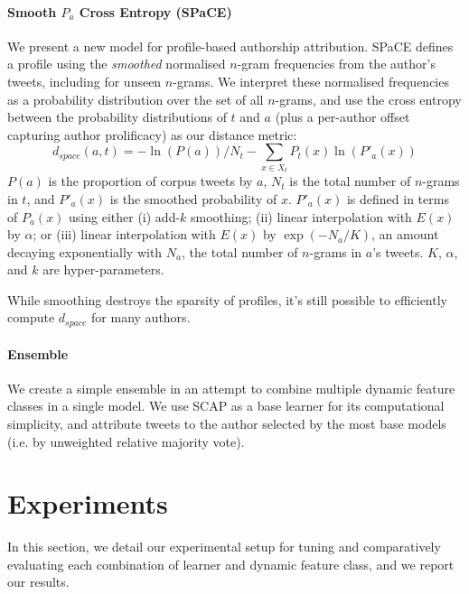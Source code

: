 \documentclass[twocolumn,10pt]{article}
\begin{document}
\paragraph{Smooth $P_a$ Cross Entropy (SPaCE)}
\hypertarget{par:space}{}
We present a new model for profile-based authorship attribution.
SPaCE defines a profile using the \emph{smoothed} normalised
$n$-gram frequencies from the author's tweets, including for
unseen $n$-grams. 
We interpret these normalised frequencies as a probability
distribution over the set of all $n$-grams, and use the cross
entropy between the probability distributions of $t$ and $a$
(plus a per-author offset capturing author prolificacy)
as our distance metric:
$$
d_{space}(a, t) =
    - \ln (P(a)) / N_t
    - \sum_{x \in X_t} P_t(x) \ln (P'_a(x))
$$
$P(a)$ is the proportion of corpus tweets by $a$,
$N_t$ is the total number of $n$-grams in $t$, and
$P'_a(x)$ is the smoothed probability of $x$.
$P'_a(x)$ is defined in terms of $P_a(x)$ using either
(i)   add-$k$ smoothing;
(ii)  linear interpolation with $E(x)$ by $\alpha$; or
(iii) linear interpolation with $E(x)$ by $\exp(-N_a/K)$,
      an amount decaying exponentially with $N_a$,
      the total number of $n$-grams in $a$'s tweets.
$K$, $\alpha$, and $k$ are hyper-parameters.

While smoothing destroys the sparsity of profiles, it's still
possible to efficiently compute $d_{space}$ for many authors.\footnotemark
{}

\paragraph{Ensemble}
We create a simple ensemble in an attempt to combine multiple
dynamic feature classes in a single model.
We use SCAP as a base learner for its computational simplicity,
and attribute tweets to the author selected by the most
base models (i.e. by unweighted relative majority vote).




\section{Experiments}
In this section, we detail our experimental setup for tuning
and comparatively evaluating each combination of learner and dynamic feature class, and we report our results.
\end{document}
